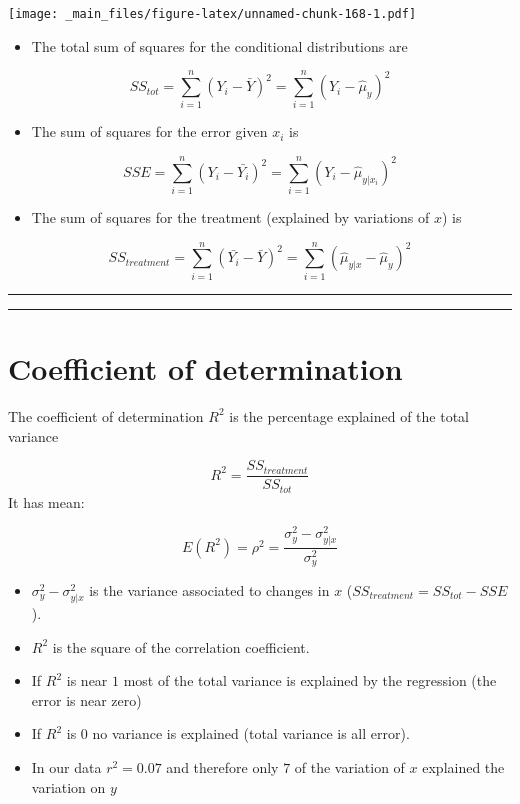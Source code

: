 \documentclass[
]{book}
\providecommand{\tightlist}{%
  \setlength{\itemsep}{0pt}\setlength{\parskip}{0pt}}
\begin{document}
\texttt{[image: \_main\_files/figure-latex/unnamed-chunk-168-1.pdf]}

\begin{itemize}
\tightlist
\item
  The total sum of squares for the conditional distributions are
\end{itemize}

\[SS_{tot}=\sum_{i=1}^n(Y_i-\bar{Y})^2=\sum_{i=1}^n(Y_i -\hat{\mu}_y)^2\]

\begin{itemize}
\tightlist
\item
  The sum of squares for the error given \(x_i\) is
\end{itemize}

\[SSE=\sum_{i=1}^n(Y_i-\bar{Y_i})^2=\sum_{i=1}^n(Y_i-\hat{\mu}_{y|x_i})^2\]

\begin{itemize}
\tightlist
\item
  The sum of squares for the treatment (explained by variations of \(x\)) is
\end{itemize}

\[SS_{treatment}=\sum_{i=1}^n(\bar{Y_i}-\bar{Y})^2=\sum_{i=1}^n(\hat{\mu}_{y|x} -\hat{\mu}_y)^2\]

\begin{center}\rule{0.5\linewidth}{0.5pt}\end{center}

\begin{center}\rule{0.5\linewidth}{0.5pt}\end{center}

\hypertarget{coefficient-of-determination}{%
\section{Coefficient of determination}\label{coefficient-of-determination}}

The coefficient of determination \(R^2\) is the percentage explained of the total variance

\[R^2=\frac{SS_{treatment}}{SS_{tot}}\]
It has mean:

\[E(R^2)=\rho^2=\frac{\sigma^2_{y}-\sigma^2_{y|x}}{\sigma^2_{y}}\]

\begin{itemize}
\item
  \(\sigma_y^2-\sigma^2_{y|x}\) is the variance associated to changes in \(x\) (\(SS_{treatment}=SS_{tot} - SSE\)).
\item
  \(R^2\) is the square of the correlation coefficient.
\item
  If \(R^2\) is near \(1\) most of the total variance is explained by the regression (the error is near zero)
\item
  If \(R^2\) is \(0\) no variance is explained (total variance is all error).
\item
  In our data \(r^2=0.07\) and therefore only \(7%
  \) of the variation of \(x\) explained the variation on \(y\)
\end{itemize}
\end{document}
